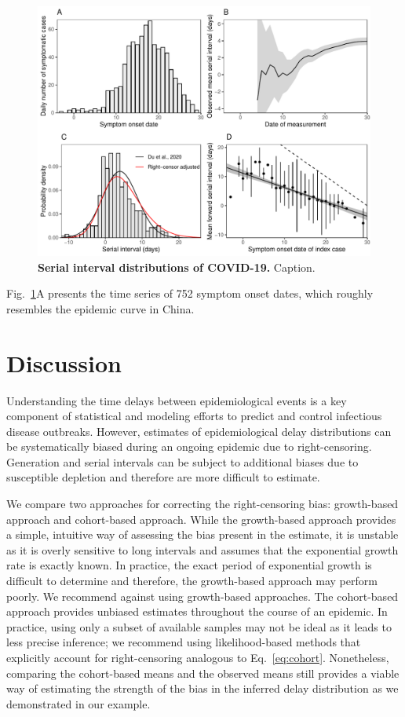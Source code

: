 \documentclass[12pt]{article}
\newcommand{\eref}[1]{Eq.~\ref{eq:#1}}
\newcommand{\fref}[1]{Fig.~\ref{fig:#1}}
\begin{document}
\begin{figure}[!th]
\includegraphics[width=\textwidth]{serial.pdf}
\caption{
\textbf{Serial interval distributions of COVID-19.}
Caption.
}
\label{fig:serial}
\end{figure}

\fref{serial}A presents the time series of 752 symptom onset dates, which roughly resembles the epidemic curve in China.


\section{Discussion}

Understanding the time delays between epidemiological events is a key component of statistical and modeling efforts to predict and control infectious disease outbreaks.
However, estimates of epidemiological delay distributions can be systematically biased during an ongoing epidemic due to right-censoring.
Generation and serial intervals can be subject to additional biases due to susceptible depletion and therefore are more difficult to estimate.

We compare two approaches for correcting the right-censoring bias: growth-based approach and cohort-based approach.
While the growth-based approach provides a simple, intuitive way of assessing the bias present in the estimate, it is unstable as it is overly sensitive to long intervals and assumes that the exponential growth rate is exactly known.
In practice, the exact period of exponential growth is difficult to determine \citep{ma2014estimating} and therefore, the growth-based approach may perform poorly.
We recommend against using growth-based approaches.
The cohort-based approach provides unbiased estimates throughout the course of an epidemic.
In practice, using only a subset of available samples may not be ideal as it leads to less precise inference;
we recommend using likelihood-based methods that explicitly account for right-censoring analogous to \eref{cohort}.
Nonetheless, comparing the cohort-based means and the observed means still provides a viable way of estimating the strength of the bias in the inferred delay distribution as we demonstrated in our example.
\end{document}
